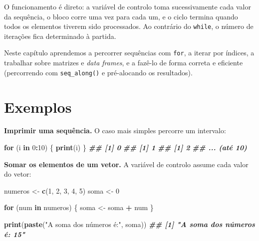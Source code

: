 \documentclass[
  portuguese,
  11pt,
  openany]{book}
\newenvironment{Shaded}{\begin{snugshade}}{\end{snugshade}}
\newcommand{\ControlFlowTok}[1]{\textcolor[rgb]{0.13,0.29,0.53}{\textbf{#1}}}
\newcommand{\DecValTok}[1]{\textcolor[rgb]{0.00,0.00,0.81}{#1}}
\newcommand{\DocumentationTok}[1]{\textcolor[rgb]{0.56,0.35,0.01}{\textbf{\textit{#1}}}}
\newcommand{\FunctionTok}[1]{\textcolor[rgb]{0.13,0.29,0.53}{\textbf{#1}}}
\newcommand{\NormalTok}[1]{#1}
\newcommand{\OtherTok}[1]{\textcolor[rgb]{0.56,0.35,0.01}{#1}}
\newcommand{\SpecialCharTok}[1]{\textcolor[rgb]{0.81,0.36,0.00}{\textbf{#1}}}
\newcommand{\StringTok}[1]{\textcolor[rgb]{0.31,0.60,0.02}{#1}}
\begin{document}
O funcionamento é direto: a variável de controlo toma sucessivamente cada valor da
sequência, o bloco corre uma vez para cada um, e o ciclo termina quando todos os
elementos tiverem sido processados. Ao contrário do \texttt{while}, o número de iterações
fica determinado à partida.

Neste capítulo aprendemos a percorrer sequências com \texttt{for}, a iterar por índices, a
trabalhar sobre matrizes e \emph{data frames}, e a fazê-lo de forma correta e eficiente
(percorrendo com \texttt{seq\_along()} e pré-alocando os resultados).

\section{Exemplos}\label{exemplos-1}

\textbf{Imprimir uma sequência.} O caso mais simples percorre um intervalo:

\begin{Shaded}
\begin{Highlighting}[]
\ControlFlowTok{for}\NormalTok{ (i }\ControlFlowTok{in} \DecValTok{0}\SpecialCharTok{:}\DecValTok{10}\NormalTok{) \{}
  \FunctionTok{print}\NormalTok{(i)}
\NormalTok{\}}
\DocumentationTok{\#\# [1] 0}
\DocumentationTok{\#\# [1] 1}
\DocumentationTok{\#\# [1] 2}
\DocumentationTok{\#\# ... (até 10)}
\end{Highlighting}
\end{Shaded}

\textbf{Somar os elementos de um vetor.} A variável de controlo assume cada valor do
vetor:

\begin{Shaded}
\begin{Highlighting}[]
\NormalTok{numeros }\OtherTok{\textless{}{-}} \FunctionTok{c}\NormalTok{(}\DecValTok{1}\NormalTok{, }\DecValTok{2}\NormalTok{, }\DecValTok{3}\NormalTok{, }\DecValTok{4}\NormalTok{, }\DecValTok{5}\NormalTok{)}
\NormalTok{soma }\OtherTok{\textless{}{-}} \DecValTok{0}

\ControlFlowTok{for}\NormalTok{ (num }\ControlFlowTok{in}\NormalTok{ numeros) \{}
\NormalTok{  soma }\OtherTok{\textless{}{-}}\NormalTok{ soma }\SpecialCharTok{+}\NormalTok{ num}
\NormalTok{\}}

\FunctionTok{print}\NormalTok{(}\FunctionTok{paste}\NormalTok{(}\StringTok{"A soma dos números é:"}\NormalTok{, soma))}
\DocumentationTok{\#\# [1] "A soma dos números é: 15"}
\end{Highlighting}
\end{Shaded}
\end{document}
